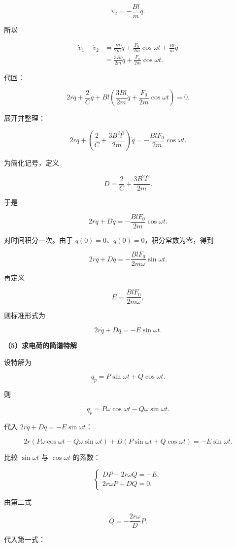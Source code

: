 \documentclass[12pt,a4paper,UTF8]{ctexart}
\begin{document}
\[
\dot v_2=-\frac{Bl}{m}\dot q.
\]

所以

\[
\begin{aligned}
\dot v_1-\dot v_2
&=\frac{Bl}{2m}\dot q+\frac{F_0}{2m}\cos\omega t
+\frac{Bl}{m}\dot q\\
&=\frac{3Bl}{2m}\dot q+\frac{F_0}{2m}\cos\omega t.
\end{aligned}
\]

代回：

\[
2r\ddot q+\frac{2}{C}\dot q
+Bl\left(\frac{3Bl}{2m}\dot q+\frac{F_0}{2m}\cos\omega t\right)=0.
\]

展开并整理：

\[
2r\ddot q+\left(\frac2C+\frac{3B^2l^2}{2m}\right)\dot q
=-\frac{BlF_0}{2m}\cos\omega t.
\]

为简化记号，定义

\[
\boxed{D=\frac2C+\frac{3B^2l^2}{2m}}.
\]

于是

\[
2r\ddot q+D\dot q=-\frac{BlF_0}{2m}\cos\omega t.
\]

对时间积分一次。由于 \(q(0)=0\)、\(\dot q(0)=0\)，积分常数为零，得到

\[
2r\dot q+Dq=-\frac{BlF_0}{2m\omega}\sin\omega t.
\]

再定义

\[
\boxed{E=\frac{BlF_0}{2m\omega}},
\]

则标准形式为

\[
\boxed{2r\dot q+Dq=-E\sin\omega t}.
\]

\textbf{（5）求电荷的简谐特解}

设特解为

\[q_p=P\sin\omega t+Q\cos\omega t.\]

则

\[\dot q_p=P\omega\cos\omega t-Q\omega\sin\omega t.\]

代入 \(2r\dot q+Dq=-E\sin\omega t\)：

\[
2r(P\omega\cos\omega t-Q\omega\sin\omega t)
+D(P\sin\omega t+Q\cos\omega t)
=-E\sin\omega t.
\]

比较 \(\sin\omega t\) 与 \(\cos\omega t\) 的系数：

\[
\begin{cases}
DP-2r\omega Q=-E,\\
2r\omega P+DQ=0.
\end{cases}
\]

由第二式

\[Q=-\frac{2r\omega}{D}P.\]

代入第一式：
\end{document}
